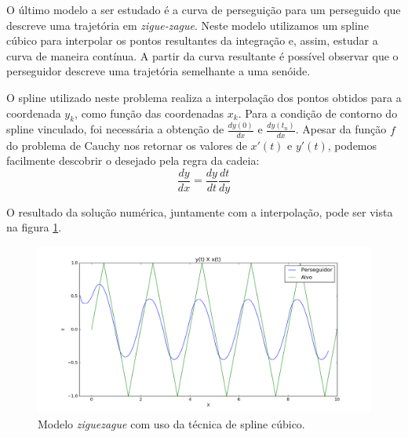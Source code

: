 \documentclass[a4paper,10pt]{article}
\begin{document}
  O último modelo a ser estudado é a curva de perseguição para um perseguido que descreve uma trajetória em \emph{zigue-zague}. Neste modelo utilizamos um spline cúbico para interpolar os pontos resultantes da integração e, assim, estudar a curva de maneira contínua. A partir da curva resultante é possível observar que o perseguidor descreve uma trajetória semelhante a uma senóide.
  
  O spline utilizado neste problema realiza a interpolação dos pontos obtidos para a coordenada $y_k$, como função das coordenadas $x_k$. Para a condição de contorno do spline vinculado, foi necessária a obtenção de $\frac{dy(0)}{dx}$ e $\frac{dy(t_n)}{dx}$. Apesar da função $f$ do problema de Cauchy nos retornar os valores de $x'(t)$ e $y'(t)$, podemos facilmente descobrir o desejado pela regra da cadeia:
  \begin{equation}
   \frac{dy}{dx} = \frac{dy}{dt} \frac{dt}{dy}
  \end{equation}
  
  O resultado da solução numérica, juntamente com a interpolação, pode ser vista na figura \ref{fig:curva-zz}.
  
  \begin{figure}[H]
   \includegraphics[width=\textwidth]{zz-XY-spline.png}
   \caption{Modelo \emph{ziguezague} com uso da técnica de spline cúbico.}
   \label{fig:curva-zz}
  \end{figure}  
  
\end{document}
